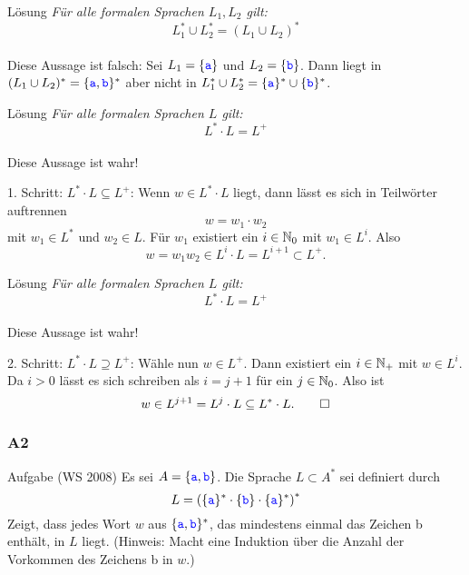 \begin{frame}[t]{Lösung}
	\textit{Für alle formalen Sprachen $L_1 , L_2$ gilt: 
		$$L_1^\ast \cup L_2^\ast = (L_1 \cup L_2 )^\ast$$ } \\[2em] \pause
	Diese Aussage ist falsch: Sei $L_1 = \{\word a\}$ und $L_2 = \{\word b\}$. Dann liegt  in $(L_1 \cup L_2 )^\ast = \{\word a, \word b\}^\ast$ aber nicht in $L_1^\ast \cup L_2^\ast = \{\word a\}^\ast \cup \{\word b\}^\ast$.
\end{frame}

\begin{frame}[t]{Lösung}
	\textit{Für alle formalen Sprachen $L$ gilt: 
		$$L^\ast \cdot L = L^+ $$ } \\[1em] \pause
	Diese Aussage ist wahr! 
	\begin{block}{1. Schritt: $L^\ast \cdot L \subseteq L^+$:} \pause
	Wenn $w \in L^\ast \cdot L$ liegt, dann lässt es sich in Teilwörter auftrennen $$ w = w_1 \cdot w_2$$ mit $w_1 \in L^\ast$ und $w_2 \in L$. Für $w_1$ existiert ein $i \in \N_0$ mit $w_1 \in L^i$. Also $$w = w_1 w_2 \in L^i \cdot L = L^{i+1} \subset L^+.$$
	\end{block}
\end{frame}

\begin{frame}[t]{Lösung}
	\textit{Für alle formalen Sprachen $L$ gilt: 
		$$L^\ast \cdot L = L^+ $$ } \\[1em] 
	Diese Aussage ist wahr! 
	\begin{block}{2. Schritt: $L^\ast \cdot L \supseteq L^+$:} \pause
	Wähle nun $w \in L^+$. Dann existiert ein $i \in \N_+$ mit $w \in L^i$. Da $i > 0$ lässt es sich schreiben als $i = j + 1$ für ein $j \in \N_0$. Also ist $$w \in L^{j+1} = L^j \cdot L \subset L^\ast \cdot L. \qed$$
	\end{block}
\end{frame}

\subsubsection{A2}
\begin{frame}{Aufgabe (WS 2008)}
	Es sei $A = \{\word a, \word b\}$. Die Sprache $L \subset A^\ast$ sei definiert durch $$L = \left(\{\word a\}^\ast \cdot \{\word b\} \cdot \{\word a\}^\ast \right)^\ast$$
	Zeigt, dass jedes Wort $w$ aus $\{\word a, \word b\}^\ast$, das mindestens einmal das Zeichen
	\word b enthält, in $L$ liegt. (Hinweis: Macht eine Induktion über die Anzahl der
	Vorkommen des Zeichens \word b in $w$.)
\end{frame}

